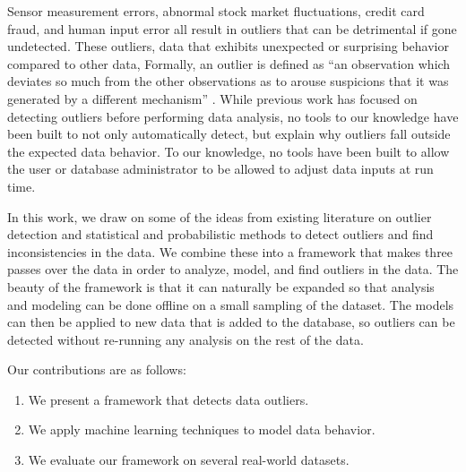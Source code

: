 
Sensor measurement errors, abnormal stock market fluctuations, credit card fraud, and human input error all result in outliers that can be detrimental if gone undetected.
These outliers, data that exhibits unexpected or surprising behavior compared to other data, 
Formally, an outlier is defined as “an observation which deviates so much from the other observations as to arouse suspicions that it was generated by a different mechanism” \cite{Hawkins1980}.
While previous work has focused on detecting outliers before performing data analysis, no tools to our knowledge have been built to not only automatically detect, but explain why outliers fall outside the expected data behavior.
To our knowledge, no tools have been built to allow the user or database administrator to be allowed to adjust data inputs at run time.


In this work, we draw on some of the ideas from existing literature on outlier detection and statistical and probabilistic methods to detect outliers and find inconsistencies in the data.
We combine these into a framework that makes three passes over the data in order to analyze, model, and find outliers in the data.
The beauty of the framework is that it can naturally be expanded so that analysis and modeling can be done offline on a small sampling of the dataset.
The models can then be applied to new data that is added to the database, so outliers can be detected without re-running any analysis on the rest of the data.

Our contributions are as follows:
\begin{enumerate}
\item We present a framework that detects data outliers.
\item We apply machine learning techniques to model data behavior.
\item We evaluate our framework on several real-world datasets.
\end{enumerate}


